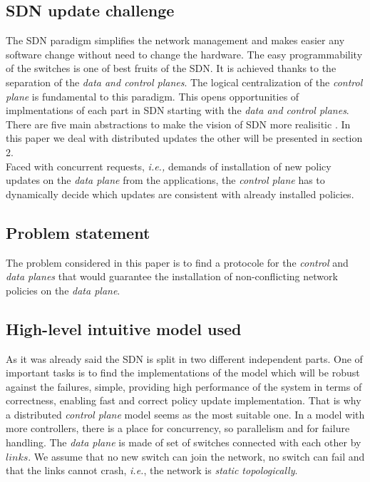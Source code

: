 \documentclass{article}
\theoremstyle{remark}
\begin{document}
\subsection{ SDN update challenge}
The SDN paradigm simplifies the network management and makes easier any software change without need to change the hardware. The easy programmability of the switches is one of best fruits of the SDN. It is achieved thanks to the separation of the \emph{data and control planes}. The logical centralization of the \emph{control plane} is fundamental to this paradigm. 
This opens opportunities of implmentations of each part in SDN starting with the \emph{data and control planes}.
There are five main abstractions to make the vision of SDN more realisitic\cite{Casado:2014:ASN:2661061.2661063} . In this paper we deal with distributed updates the other will be presented in section 2.\\ 
Faced with concurrent requests, \emph{i.e.,} demands of installation of new policy updates on the \emph{data plane}  from the applications, the \emph{control plane} has to dynamically decide which updates are consistent with already installed policies.
\subsection{Problem statement}
The problem considered in this paper is to find a protocole for the \emph{control} and \emph{data planes} that would guarantee the installation of non-conflicting network policies on the \emph{data plane}. 
\subsection{High-level intuitive model used}
As it was already said the SDN is split in two different independent parts. One of important tasks is to find the implementations of the model which will be robust against the failures, simple, providing high performance of the system in terms of correctness, enabling fast and correct policy update implementation.
That is why a distributed \emph{control plane} model seems as the most suitable one. In a model with more controllers, there is a place for concurrency, so parallelism and for failure handling. 
The \emph{data plane} is made of set of switches connected with each other by $links$. We assume that no new switch can join the network, no switch can fail and that the links cannot crash, \emph{i.e.}, the network is \emph{static topologically}. 
  
\end{document}
